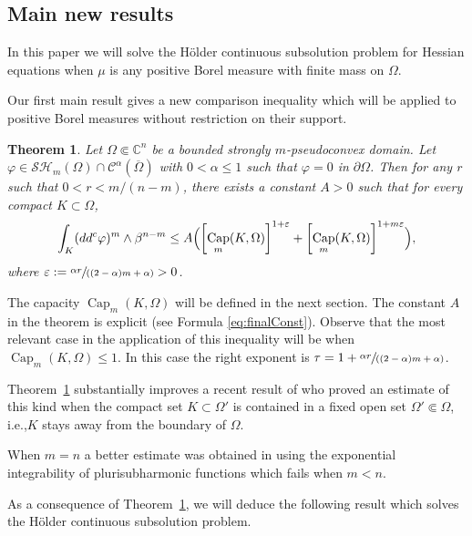 \documentclass[11pt]{article}
\newcommand{\ie}{i.e.,\xspace}
\providecommand{\C}{}
\numberwithin{equation}{section}
\let\epsilon\varepsilon
\newcommand{\spfrac}[2]{\sfrac{#1}{(#2)}}
\newtheorem{theo}{Theorem}
\theoremstyle{definition}
\renewcommand{\C}{\mathbb{C}}
\newcommand{\Cc}{\mathcal{C}}
\DeclareMathOperator{\Capa}{Cap}
\theoremstyle{plain}
\theoremstyle{definition}
\begin{document}
\subsection{Main new results}

In this paper we will solve the Hölder continuous subsolution problem for Hessian equations when $\mu$ is any positive Borel measure with finite mass on $\Omega$.

Our first main result gives a new comparison inequality which will be applied to positive Borel measures without restriction on their support.

\begin{theo}\label{th:A}
Let $\Omega \Subset \C^n$ be a bounded strongly $m$-pseudoconvex domain.
Let $\varphi\in \mathcal{SH}_m(\Omega)\cap \Cc^{\alpha}(\overline\Omega)$ with $0 < \alpha \leq 1$ such that $\varphi = 0$ in $\partial \Omega$. Then for any $r$ such that $0 < r < m \slash (n-m)$, there exists a constant $A>0$ such that for every compact $K\subset\Omega$,
\[
\int_ K (dd^c\varphi)^m\wedge\beta^{n-m} \leq A\Bigl(\left[\Capa_m (K,\Omega)\right]^{1 + \epsilon} + \left[\Capa_m (K,\Omega)\right]^{1 + m\epsilon}\Bigr),
\]
where $\epsilon:= \spfrac{\alpha r}{(2-\alpha) m + \alpha} > 0$.
\end{theo}

The capacity $\Capa_m (K,\Omega)$ will be defined in the next section. The constant $A$ in the theorem is explicit (see Formula \eqref{eq:finalConst}). Observe that the most relevant case in the application of this inequality will be when $\Capa_m (K,\Omega) \leq 1$. In this case the right exponent is $\tau = 1 + \spfrac{\alpha r}{(2-\alpha) m + \alpha}$.

Theorem~\ref{th:A} substantially improves a recent result of \cite{KN19} who proved an estimate of this kind when the compact set $K \subset \Omega'$ is contained in a fixed open set $\Omega' \Subset \Omega$, \ie $K$ stays away from the boundary of $\Omega$.

When $m=n$ a better estimate was obtained in \cite{N18a} using the exponential integrability of plurisubharmonic functions which fails when $m < n$.

As a consequence of Theorem~\ref{th:A}, we will deduce the following result which solves the Hölder continuous subsolution problem.
\end{document}
